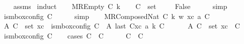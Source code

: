 \begin{isabellebody}
%
\isadelimproof
\ \ %
\endisadelimproof
%
\isatagproof
{}\isamarkupfalse%
\ assms\isanewline
{}\isamarkupfalse%
\ induct\isanewline
\ \ \isamarkupfalse%
\ {\isacharparenleft}{\kern0pt}MREmpty\ C\ k{\isacharparenright}{\kern0pt}\isanewline
\ \ \isamarkupfalse%
\ {\isachardoublequoteopen}C{\isacharprime}{\kern0pt}\ {\isasymin}\ set\ {\isacharbrackleft}{\kern0pt}{\isacharbrackright}{\kern0pt}{\isachardoublequoteclose}\isanewline
\ \ \isamarkupfalse%
\ False\isanewline
\ \ \ \ \isamarkupfalse%
\ simp\isanewline
\ \ \isamarkupfalse%
\ {\isachardoublequoteopen}is{\isacharunderscore}{\kern0pt}mbox{\isacharunderscore}{\kern0pt}config\ C{\isacharprime}{\kern0pt}{\isachardoublequoteclose}\isanewline
\ \ \ \ \isamarkupfalse%
\ simp\isanewline
{}\isamarkupfalse%
\isanewline
\ \ \isamarkupfalse%
\ {\isacharparenleft}{\kern0pt}MRComposedNat\ C{}\ k\ w\ xc\ a\ C{\isacharparenright}{\kern0pt}\isanewline
\ \ \isamarkupfalse%
\ A{}{\isacharcolon}{\kern0pt}\ {\isachardoublequoteopen}C{\isacharprime}{\kern0pt}\ {\isasymin}\ set\ xc\ {\isasymLongrightarrow}\ is{\isacharunderscore}{\kern0pt}mbox{\isacharunderscore}{\kern0pt}config\ C{\isacharprime}{\kern0pt}{\isachardoublequoteclose}\ \ A{}{\isacharcolon}{\kern0pt}\ {\isachardoublequoteopen}last\ {\isacharparenleft}{\kern0pt}C{}{\isacharhash}{\kern0pt}xc{\isacharparenright}{\kern0pt}\ {\isasymmidarrow}{\isasymlangle}a{\isacharcomma}{\kern0pt}\ k{\isasymrangle}{\isasymrightarrow}\ C{\isachardoublequoteclose}\isanewline
\ \ \ \ \ \ A{}{\isacharcolon}{\kern0pt}\ {\isachardoublequoteopen}C{\isacharprime}{\kern0pt}\ {\isasymin}\ set\ {\isacharparenleft}{\kern0pt}xc\ {\isasymcdot}\ {\isacharbrackleft}{\kern0pt}C{\isacharbrackright}{\kern0pt}{\isacharparenright}{\kern0pt}{\isachardoublequoteclose}\isanewline
\ \ \isamarkupfalse%
\ {\isachardoublequoteopen}is{\isacharunderscore}{\kern0pt}mbox{\isacharunderscore}{\kern0pt}config\ C{\isacharprime}{\kern0pt}{\isachardoublequoteclose}\isanewline
\ \ \isamarkupfalse%
\ {\isacharparenleft}{\kern0pt}cases\ {\isachardoublequoteopen}C\ {\isacharequal}{\kern0pt}\ C{\isacharprime}{\kern0pt}{\isachardoublequoteclose}{\isacharparenright}{\kern0pt}\isanewline
\ \ \ \ \isamarkupfalse%
\ {\isachardoublequoteopen}C\ {\isacharequal}{\kern0pt}\ C{\isacharprime}{\kern0pt}{\isachardoublequoteclose}\isanewline

\end{isabellebody}
